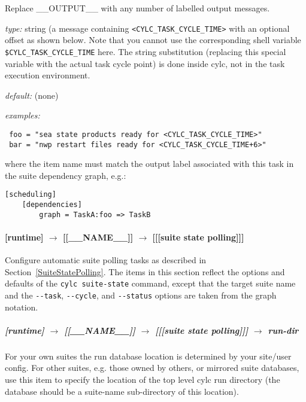 Replace \_\_OUTPUT\_\_ with any number of labelled output messages.
\begin{myitemize}
    \item {\em type:} string (a message containing
        \lstinline=<CYLC_TASK_CYCLE_TIME>= with an optional offset as shown
        below. Note that you cannot use the corresponding shell variable
        \lstinline=$CYLC_TASK_CYCLE_TIME= here. The string substitution
        (replacing this special variable with the actual task cycle point) is
        done inside cylc, not in the task execution environment.
\item {\em default:} (none)
\item{ \em examples:}
 \begin{lstlisting}
 foo = "sea state products ready for <CYLC_TASK_CYCLE_TIME>"
 bar = "nwp restart files ready for <CYLC_TASK_CYCLE_TIME+6>"
 \end{lstlisting}
 where the item name must match the output label associated with
 this task in the suite dependency graph, e.g.:
\lstset{language=suiterc}
\begin{lstlisting}
[scheduling]
    [dependencies]
        graph = TaskA:foo => TaskB
 \end{lstlisting}
\end{myitemize}
\lstset{language=transcript}

\paragraph[{[[[}suite state polling{]]]}]{[runtime] $\rightarrow$ [[\_\_NAME\_\_]] $\rightarrow$ [[[suite state polling]]]}

Configure automatic suite polling tasks as described in Section~\ref{SuiteStatePolling}. The
items in this section reflect the options and defaults of the
\lstinline=cylc suite-state= command, except that the target suite name and the
\lstinline=--task=, \lstinline=--cycle=, and \lstinline=--status= options are
taken from the graph notation.

\subparagraph[run-dir]{[runtime] $\rightarrow$ [[\_\_NAME\_\_]] $\rightarrow$ [[[suite state polling]]] $\rightarrow$ run-dir}

For your own suites the run database location is determined by your
site/user config. For other suites, e.g. those owned by others, or
mirrored suite databases, use this item to specify the location
of the top level cylc run directory (the database should be a
suite-name sub-directory of this location).

